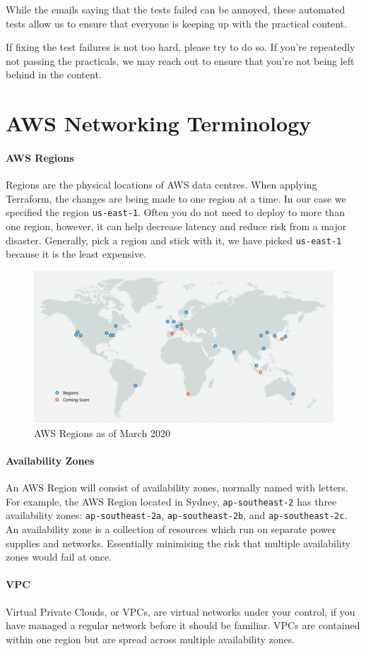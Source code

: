 \documentclass{csse4400}
\begin{document}
While the emails saying that the tests failed can be annoyed,
these automated tests allow us to ensure that everyone is keeping up with the practical content.

If fixing the test failures is not too hard,
please try to do so.
If you're repeatedly not passing the practicals,
we may reach out to ensure that you're not being left behind in the content.





\appendix

\section{AWS Networking Terminology}
\paragraph{AWS Regions}
Regions are the physical locations of AWS data centres.
When applying Terraform, the changes are being made to one region at a time.
In our case we specified the region \texttt{us-east-1}.
Often you do not need to deploy to more than one region, however,
it can help decrease latency and reduce risk from a major disaster.
Generally, pick a region and stick with it,
we have picked \texttt{us-east-1} because it is the least expensive.

\begin{figure}[ht]
\includegraphics[width=\textwidth]{images/aws_regions}
\caption{AWS Regions as of March 2020 \cite{aws-regions}}
\end{figure}

\paragraph{Availability Zones}
An AWS Region will consist of availability zones, normally named with letters.
For example, the AWS Region located in Sydney, \texttt{ap-southeast-2} has three availability zones:
\texttt{ap-southeast-2a}, \texttt{ap-southeast-2b}, and \texttt{ap-southeast-2c}.
An availability zone is a collection of resources which run on separate power supplies and networks.
Essentially minimising the risk that multiple availability zones would fail at once.

\paragraph{VPC}
Virtual Private Clouds, or VPCs,
are virtual networks under your control,
if you have managed a regular network before it should be familiar.
VPCs are contained within one region but are spread across multiple availability zones.
\end{document}
